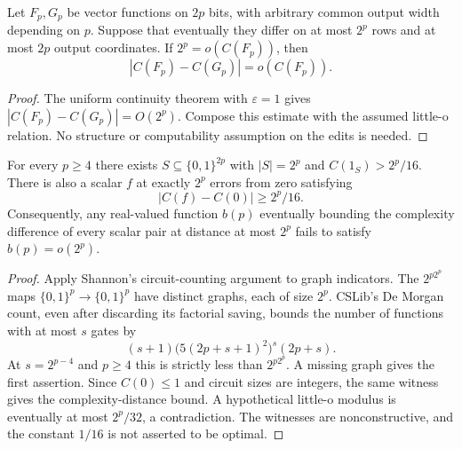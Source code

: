 \begin{corollary}
  \label{cor:lowerbounds-sparse-relative-stability}
  \leanok
  Let $F_p,G_p$ be vector functions on $2p$ bits, with arbitrary common
  output width depending on $p$. Suppose that eventually they differ on at
  most $2^p$ rows and at most $2p$ output coordinates. If
  $2^p=o(C(F_p))$, then
  \[
    |C(F_p)-C(G_p)|=o(C(F_p)).
  \]
\end{corollary}
\begin{proof}
  \leanok
  The uniform continuity theorem with $\varepsilon=1$ gives
  $|C(F_p)-C(G_p)|=O(2^p)$. Compose this estimate with the assumed little-o
  relation. No structure or computability assumption on the edits is needed.
\end{proof}

\begin{theorem}
  \label{thm:lowerbounds-sparse-correction-sharpness}
  \leanok
  For every $p\ge4$ there exists $S\subseteq\{0,1\}^{2p}$ with $|S|=2^p$
  and $C(1_S)>2^p/16$. There is also a scalar $f$ at exactly $2^p$ errors
  from zero satisfying
  \[
    |C(f)-C(0)|\ge 2^p/16.
  \]
  Consequently, any real-valued function $b(p)$ eventually bounding the
  complexity difference of every scalar pair at distance at most $2^p$
  fails to satisfy $b(p)=o(2^p)$.
\end{theorem}
\begin{proof}
  \leanok
  Apply Shannon's circuit-counting argument to graph indicators. The
  $2^{p2^p}$ maps $\{0,1\}^p\to\{0,1\}^p$ have distinct graphs, each of
  size $2^p$. CSLib's De Morgan count, even after discarding its factorial
  saving, bounds the number of functions with at most $s$ gates by
  \[
    (s+1)\bigl(5(2p+s+1)^2\bigr)^s(2p+s).
  \]
  At $s=2^{p-4}$ and $p\ge4$ this is strictly less than $2^{p2^p}$.
  A missing graph gives the first assertion. Since $C(0)\le1$ and circuit
  sizes are integers, the same witness gives the complexity-distance bound.
  A hypothetical little-o modulus is eventually at most $2^p/32$, a
  contradiction. The witnesses are nonconstructive, and the constant
  $1/16$ is not asserted to be optimal.
\end{proof}

